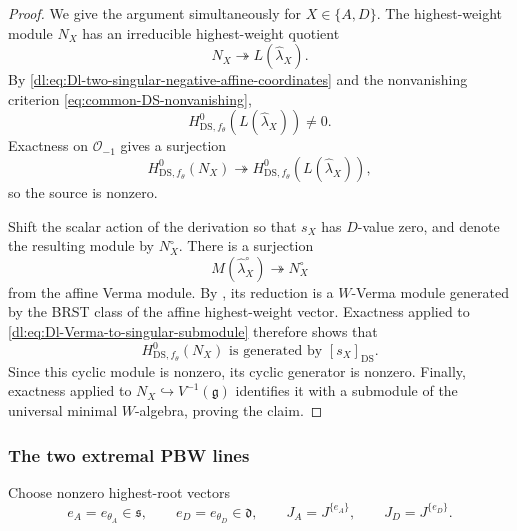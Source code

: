 \documentclass[11pt,reqno]{amsart}
\theoremstyle{definition}
\theoremstyle{remark}
\begin{document}
\begin{proof}
We give the argument simultaneously for
\(X\in\{A,D\}\).  The highest-weight module \(N_X\) has an irreducible
highest-weight quotient
\begin{equation*}
  N_X\twoheadrightarrow L(\widehat\lambda_X).
\end{equation*}
By \eqref{dl:eq:Dl-two-singular-negative-affine-coordinates} and the
nonvanishing criterion
\eqref{eq:common-DS-nonvanishing},
\begin{equation*}
  H^0_{\mathrm{DS},f_\theta}
  \!\left(L(\widehat\lambda_X)\right)\ne0.
\end{equation*}
Exactness on \(\mathcal O_{-1}\) gives a surjection
\begin{equation*}
  H^0_{\mathrm{DS},f_\theta}(N_X)
  \twoheadrightarrow
  H^0_{\mathrm{DS},f_\theta}
  \!\left(L(\widehat\lambda_X)\right),
\end{equation*}
so the source is nonzero.

Shift the scalar action of the derivation so that \(s_X\) has
\(D\)-value zero, and denote the resulting module by \(N_X^\circ\).
There is a surjection
\begin{equation}
  M(\widehat\lambda_X^\circ)
  \twoheadrightarrow
  N_X^\circ
  \label{dl:eq:Dl-Verma-to-singular-submodule}
\end{equation}
from the affine Verma module.  By
\cite[Theorem~6.3]{KacWakimoto2004}, its reduction is a
\(W\)-Verma module generated by the BRST class of the affine
highest-weight vector.  Exactness applied to
\eqref{dl:eq:Dl-Verma-to-singular-submodule} therefore shows that
\begin{equation}
  H^0_{\mathrm{DS},f_\theta}(N_X)
  \text{ is generated by }[s_X]_{\mathrm{DS}}.
  \label{dl:eq:Dl-individual-reduction-cyclic}
\end{equation}
Since this cyclic module is nonzero, its cyclic generator is nonzero.
Finally, exactness applied to
\(N_X\hookrightarrow V^{-1}(\mathfrak g)\) identifies it with a
submodule of the universal minimal \(W\)-algebra, proving the claim.
\end{proof}

\subsubsection{The two extremal PBW lines}


Choose nonzero highest-root vectors
\begin{equation}
  e_A=e_{\theta_A}\in\mathfrak s,
  \qquad
  e_D=e_{\theta_D}\in\mathfrak d,
  \qquad
  J_A=J^{\{e_A\}},
  \qquad
  J_D=J^{\{e_D\}}.
  \label{dl:eq:Dl-two-highest-root-currents}
\end{equation}
\end{document}
